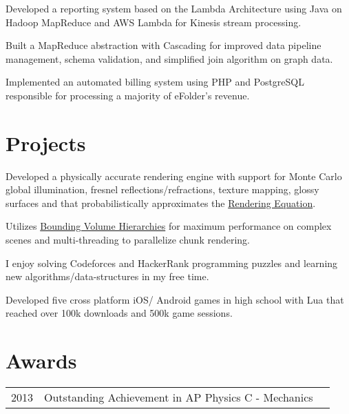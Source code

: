\documentclass[]{resume}
\begin{document}
\begin{minipage}[t]{0.66\textwidth}
\begin{tightemize}
\item Developed a reporting system based on the Lambda Architecture using Java on
Hadoop MapReduce and AWS Lambda for Kinesis stream processing.
\item Built a MapReduce abstraction with Cascading for improved data pipeline
management, schema validation, and simplified join algorithm on graph data.
\item Implemented an automated billing system using PHP and PostgreSQL
responsible for processing a majority of eFolder's revenue.
\end{tightemize}
\sectionsep


\section{Projects}

\begin{tightemize}
\item Developed a physically accurate rendering engine with support for Monte
Carlo global illumination, fresnel reflections/refractions, texture mapping,
glossy surfaces and that probabilistically approximates the
\href{https://en.wikipedia.org/wiki/Rendering_equation}{Rendering Equation}.
\item Utilizes \href{https://en.wikipedia.org/wiki/Bounding_volume_hierarchy}{Bounding Volume Hierarchies}
for maximum performance on complex scenes and multi-threading to parallelize
chunk rendering.
\end{tightemize}
\sectionsep

\begin{tightemize}
\item I enjoy solving Codeforces and HackerRank programming puzzles and
learning new algorithms/data-structures in my free time.
\end{tightemize}
\sectionsep

\begin{tightemize}
\item Developed five cross platform iOS/ Android games in high school with Lua
that reached over 100k downloads and 500k game sessions.
\end{tightemize}
\sectionsep


\section{Awards}
\begin{tabular}{rll}
2013 & Outstanding Achievement in AP Physics C - Mechanics \\
\end{tabular}
\sectionsep

\end{minipage}
\end{document}
